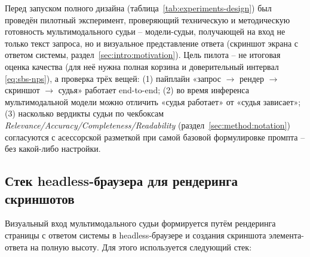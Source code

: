 Перед запуском полного дизайна (таблица~\ref{tab:experiments-design}) был
проведён пилотный эксперимент, проверяющий техническую и методическую
готовность мультимодального судьи -- модели-судьи, получающей на вход не
только текст запроса, но и визуальное представление ответа
(скриншот экрана с ответом системы, раздел~\ref{sec:intro:motivation}).
Цель пилота -- не итоговая оценка качества (для неё нужна полная корзина
и доверительный интервал \eqref{eq:sbs-nps}), а проверка трёх вещей:
(1) пайплайн «запрос $\to$ рендер $\to$ скриншот $\to$ судья» работает
end-to-end; (2) во время инференса мультимодальной модели можно отличить
«судья работает» от «судья зависает»; (3) насколько вердикты судьи по
чекбоксам \emph{Relevance/Accuracy/Completeness/Readability}
(раздел~\ref{sec:method:notation}) согласуются с асессорской разметкой при
самой базовой формулировке промпта -- без какой-либо настройки.

\subsection{Стек headless-браузера для рендеринга скриншотов}

Визуальный вход мультимодального судьи формируется путём рендеринга
страницы с ответом системы в headless-браузере и создания скриншота
элемента-ответа на полную высоту.
Для этого используется следующий стек:

